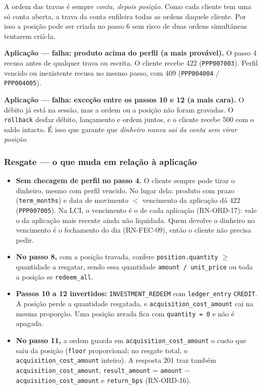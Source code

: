 \documentclass[11pt,a4paper]{article}
\newcommand{\tb}[1]{\texttt{#1}}
\begin{document}
A ordem das travas é sempre \emph{conta, depois posição}. Como cada cliente tem uma só conta
aberta, a trava da conta enfileira todas as ordens daquele cliente. Por isso a posição pode ser
criada no passo 6 sem risco de duas ordens simultâneas tentarem criá-la.

\textbf{Aplicação --- falha: produto acima do perfil (a mais provável).} O passo 4 recusa antes de
qualquer trava ou escrita. O cliente recebe 422 (\tb{PPP007003}). Perfil vencido ou inexistente
recusa no mesmo passo, com 409 (\tb{PPP004004} / \tb{PPP004005}).

\textbf{Aplicação --- falha: exceção entre os passos 10 e 12 (a mais cara).} O débito já está na
sessão, mas a ordem ou a posição não foram gravadas. O \tb{rollback} desfaz débito, lançamento e
ordem juntos, e o cliente recebe 500 com o saldo intacto. É isso que garante que \emph{dinheiro
nunca sai da conta sem virar posição}.

\subsubsection*{Resgate --- o que muda em relação à aplicação}
\begin{itemize}
  \item \textbf{Sem checagem de perfil no passo 4.} O cliente sempre pode tirar o dinheiro, mesmo
        com perfil vencido. No lugar dela: produto com prazo (\tb{term_months}) e data de movimento $<$
        vencimento da aplicação dá 422 (\tb{PPP007005}). Na LCI, o vencimento é o de cada aplicação
        (RN-ORD-17): vale o da aplicação mais recente ainda não liquidada. Quem devolve o
        dinheiro no vencimento é o fechamento do dia (RN-FEC-09), então o cliente não precisa
        pedir.
  \item \textbf{No passo 8,} com a posição travada, confere
        \tb{position.quantity} $\geq$ quantidade a resgatar, sendo essa quantidade
        \tb{amount / unit_price} ou toda a posição se \tb{redeem_all}.
  \item \textbf{Passos 10 a 12 invertidos:} \tb{INVESTMENT_REDEEM} com \tb{ledger_entry}
        \tb{CREDIT}. A posição perde a quantidade resgatada, e \tb{acquisition_cost_amount} cai na mesma
        proporção. Uma posição zerada fica com \tb{quantity = 0} e não é apagada.
  \item \textbf{No passo 11,} a ordem guarda em \tb{acquisition_cost_amount} o custo que saiu da posição
        (\tb{floor} proporcional; no resgate total, o \tb{acquisition_cost_amount} inteiro). A resposta
        201 traz também \tb{acquisition_cost_amount}, \tb{result_amount} = \tb{amount} $-$ \tb{acquisition_cost_amount} e
        \tb{return_bps} (RN-ORD-16).
\end{itemize}
\end{document}
